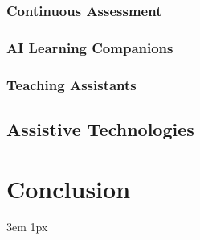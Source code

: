\documentclass{Academic}
\begin{document}
    \subsubsection{Continuous Assessment}

    \subsubsection{AI Learning Companions}

    \subsubsection{Teaching Assistants}

    \subsection{Assistive Technologies}

    \section{Conclusion}

    \singlespacing
    \emergencystretch 3em
    \hfuzz 1px
    \printbibliography[heading=bibnumbered]




\end{document}
